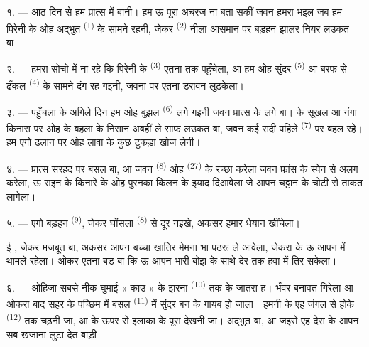\VUsaut{4.0mm}
\VUsaut{3.0mm}

\VUsaut{3.0mm}

\VUsaut{3.0mm}

१. --- आठ दिन से हम प्रात्स में बानी। हम ऊ पूरा अचरज ना बता सकीं जवन
हमरा भइल जब हम पिरेनी के ओह अद्भुत 
\textsuperscript{(1)} के सामने रहनी, जेकर 
\textsuperscript{(2)} नीला आसमान पर बड़हन झालर नियर लउकत बा।

२. --- हमरा सोचो में ना रहे कि पिरेनी के 
\textsuperscript{(3)} एतना  तक पहुँचेला, आ हम ओह सुंदर
 \textsuperscript{(5)} आ बरफ से ढँकल 
\textsuperscript{(4)} के सामने दंग रह गइनी, जवना पर एतना डरावन
 लुढ़केला।

\VUsaut{3.0mm}
\VUsaut{3.0mm}

३. --- पहुँचला के अगिले दिन हम ओह बुझल 
\textsuperscript{(6)} लगे गइनी जवन प्रात्स के लगे बा।
 के सूखल आ नंगा किनारा पर ओह  के बहला के
निसान अबहीं ले साफ लउकत बा, जवन कई सदी पहिले 
\textsuperscript{(7)} पर बहल रहे। हम एगो ढलान पर ओह लावा के कुछ टुकड़ा
खोज लेनी।

४. --- प्रात्स सरहद पर बसल बा, आ जवन  \textsuperscript{(8)}
ओह  \textsuperscript{(27)} के रच्छा करेला जवन फ्रांस के
स्पेन से अलग करेला, ऊ राइन के किनारे के ओह पुरनका किलन के इयाद दिआवेला
जे आपन चट्टान के चोटी से  ताकत लागेला।

५. --- एगो बड़हन  \textsuperscript{(9)}, जेकर घोंसला
 \textsuperscript{(8)} से दूर नइखे, अकसर हमार धेयान खींचेला।

ई , जेकर  मजबूत बा, अकसर आपन बच्चा
खातिर मेमना भा पठरू ले आवेला, जेकरा के ऊ आपन  में थामले
रहेला। ओकर  एतना बड़ बा कि ऊ आपन भारी बोझ के साथे देर तक
हवा में तिर सकेला।

\VUsaut{3.0mm}
\VUsaut{3.0mm}

६. --- ओहिजा सबसे नीक घुमाई « काउ » के झरना \textsuperscript{(10)} तक के
जातरा ह।  भँवर बनावत गिरेला आ ओकरा बाद सहर के
पच्छिम में बसल  \textsuperscript{(11)} में सुंदर
 बन के गायब हो जाला। हमनी के एह जंगल से होके  \textsuperscript{(12)} तक चढ़नी जा, आ  के ऊपर से
इलाका के पूरा  देखनी जा।  अद्भुत बा, आ
 जइसे एह देस के आपन सब खजाना लुटा देत बाड़ी।

